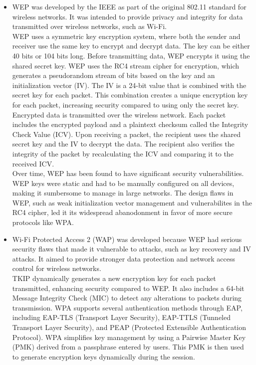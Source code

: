 \documentclass{article}
\begin{document}
\begin{itemize}
	\item[] WEP was developed by the IEEE as part of the original 802.11 standard for wireless networks. It was intended to provide privacy and integrity for data transmitted over wireless networks, such as Wi-Fi.\\
		WEP uses a symmetric key encryption system, where both the sender and receiver use the same key to encrypt and decrypt data. The key can be either 40 bits or 104 bits long. Before transmitting data, WEP encrypts it using the shared secret key. WEP uses the RC4 stream cipher for encryption, which generates a pseudorandom stream of bits based on the key and an initialization vector (IV). The IV is a 24-bit value that is combined with the secret key for each packet. This combination creates a unique encryption key for each packet, increasing security compared to using only the secret key. Encrypted data is transmitted over the wireless network. Each packet includes the encrypted payload and a plaintext checksum called the Integrity Check Value (ICV). Upon receiving a packet, the recipient uses the shared secret key and the IV to decrypt the data. The recipient also verifies the integrity of the packet by recalculating the ICV and comparing it to the received ICV.\\
		Over time, WEP has been found to have significant security vulnerabilities. WEP keys were static and had to be manually configured on all devices, making it sumbersome to manage in large networks. The design flaws in WEP, such as weak initialization vector management and vulnerabilites in the RC4 cipher, led it its widespread abanodonment in favor of more secure protocols like WPA.
	\item[] Wi-Fi Protected Access 2 (WAP) was developed because WEP had serious security flaws that made it vulnerable to attacks, such as key recovery and IV attacks. It aimed to provide stronger data protection and network access control for wireless networks.\\
		TKIP dynamically generates a new encryption key for each packet transmitted, enhancing security compared to WEP. It also includes a 64-bit Message Integrity Check (MIC) to detect any alterations to packets during transmission. WPA supports several authentication methods through EAP, including EAP-TLS (Transport Layer Security), EAP-TTLS (Tunneled Transport Layer Security), and PEAP (Protected Extensible Authentication Protocol). WPA simplifies key management by using a Pairwise Master Key (PMK) derived from a passphrase entered by users. This PMK is then used to generate encryption keys dynamically during the session.

\end{itemize}
\end{document}
